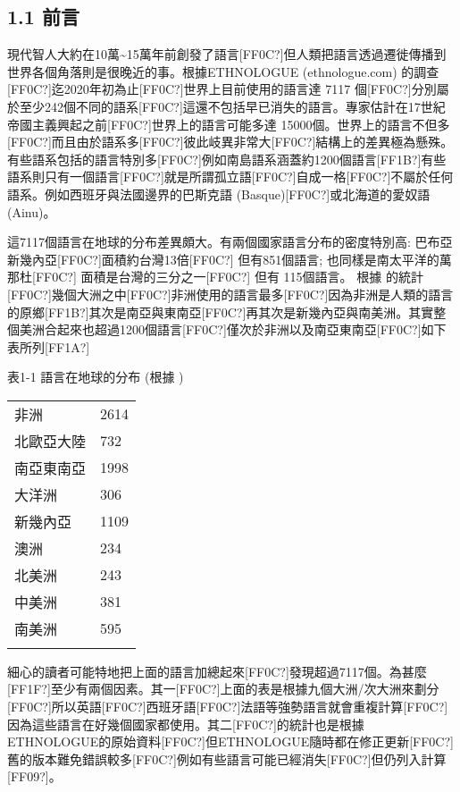 \subsection{1.1 前言} 

現代智人大約在10萬{\textasciitilde}15萬年前創發了語言[FF0C?]但人類把語言透過遷徙傳播到世界各個角落則是很晚近的事。根據ETHNOLOGUE (ethnologue.com) 的調查[FF0C?]迄2020年初為止[FF0C?]世界上目前使用的語言達 7117 個[FF0C?]分別屬於至少242個不同的語系[FF0C?]這還不包括早已消失的語言。專家估計在17世紀帝國主義興起之前[FF0C?]世界上的語言可能多達 15000個。世界上的語言不但多[FF0C?]而且由於語系多[FF0C?]彼此岐異非常大[FF0C?]結構上的差異極為懸殊。有些語系包括的語言特別多[FF0C?]例如南島語系涵蓋約1200個語言[FF1B?]有些語系則只有一個語言[FF0C?]就是所謂孤立語[FF0C?]自成一格[FF0C?]不屬於任何語系。例如西班牙與法國邊界的巴斯克語 (Basque)[FF0C?]或北海道的愛奴語 (Ainu)。

這7117個語言在地球的分布差異頗大。有兩個國家語言分布的密度特別高: 巴布亞新幾內亞[FF0C?]面積約台灣13倍[FF0C?] 但有851個語言; 也同樣是南太平洋的萬那杜[FF0C?] 面積是台灣的三分之一[FF0C?] 但有 115個語言。 根據\parencite{Nettle1999} 的統計[FF0C?]幾個大洲之中[FF0C?]非洲使用的語言最多[FF0C?]因為非洲是人類的語言的原鄉[FF1B?]其次是南亞與東南亞[FF0C?]再其次是新幾內亞與南美洲。其實整個美洲合起來也超過1200個語言[FF0C?]僅次於非洲以及南亞東南亞[FF0C?]如下表所列[FF1A?]                               

\begin{styleListParagraph}
表1-1  語言在地球的分布  (根據 \parencite{Nettle1999})
\end{styleListParagraph}

\tablefirsthead{}

\tabletail{}
\tablelasttail{}
\begin{tabularx}{\textwidth}{XX}
\lsptoprule

非洲 & 2614\\
北歐亞大陸 & 732\\
南亞東南亞 & 1998\\
大洋洲 & 306\\
新幾內亞 & 1109\\
澳洲 & 234\\
北美洲 & 243\\
中美洲 & 381\\
南美洲 & 595\\
\lspbottomrule
\end{tabularx}
細心的讀者可能特地把上面的語言加總起來[FF0C?]發現超過7117個。為甚麼[FF1F?]至少有兩個因素。其一[FF0C?]上面的表是根據九個大洲/次大洲來劃分[FF0C?]所以英語[FF0C?]西班牙語[FF0C?]法語等強勢語言就會重複計算[FF0C?]因為這些語言在好幾個國家都使用。其二[FF0C?]\parencite{Nettle1999}的統計也是根據 ETHNOLOGUE的原始資料[FF0C?]但ETHNOLOGUE隨時都在修正更新[FF0C?]舊的版本難免錯誤較多[FF0C?]例如有些語言可能已經消失[FF0C?]但仍列入計算[FF09?]。

